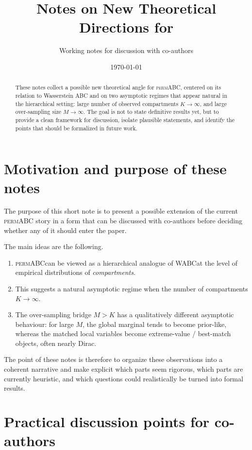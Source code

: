 \documentclass[11pt]{article}
\title{Notes on New Theoretical Directions for \permABC}
\author{Working notes for discussion with co-authors}
\date{\today}
\newcommand{\permABC}{\textsc{permABC}}
\newcommand{\WABC}{\textsc{WABC}}
\begin{document}
\maketitle

\begin{abstract}
These notes collect a possible new theoretical angle for \permABC, centered on its relation to
Wasserstein ABC and on two asymptotic regimes that appear natural in the hierarchical setting:
large number of observed compartments $K \to \infty$, and large over-sampling size
$M \to \infty$. The goal is not to state definitive results yet, but to provide a clean framework
for discussion, isolate plausible statements, and identify the points that should be formalized in
future work.
\end{abstract}

\tableofcontents

\section{Motivation and purpose of these notes}

The purpose of this short note is to present a possible extension of the current \permABC
story in a form that can be discussed with co-authors before deciding whether any of it should
enter the paper.

The main ideas are the following.
\begin{enumerate}[label=(\arabic*)]
    \item \permABC can be viewed as a hierarchical analogue of \WABC at the level of
    empirical distributions of \emph{compartments}.
    \item This suggests a natural asymptotic regime when the number of compartments
    $K \to \infty$.
    \item The over-sampling bridge $M > K$ has a qualitatively different asymptotic behaviour:
    for large $M$, the global marginal tends to become prior-like, whereas the matched local
    variables become extreme-value / best-match objects, often nearly Dirac.
\end{enumerate}

The point of these notes is therefore to organize these observations into a coherent narrative and
make explicit which parts seem rigorous, which parts are currently heuristic, and which questions
could realistically be turned into formal results.



\section{Practical discussion points for co-authors}
\end{document}
